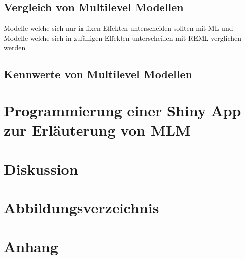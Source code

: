 \documentclass[12pt]{article}\usepackage[]{graphicx}\usepackage[]{color}
\begin{document}
\subsection{Vergleich von Multilevel Modellen}
Modelle welche sich nur in fixen Effekten unterscheiden sollten mit ML und Modelle welche sich in zufälligen Effekten unterscheiden mit REML verglichen werden \cite{SnijdersTomA.B2012Ma:a}

\subsection{Kennwerte von Multilevel Modellen}
\section{Programmierung einer Shiny App zur Erläuterung von MLM}
\section{Diskussion}
\newpage



\section{Abbildungsverzeichnis}
\section{Anhang}
\end{document}
